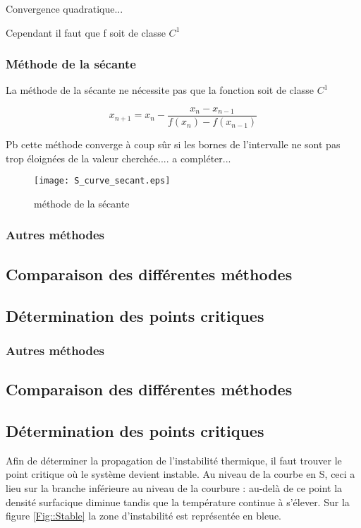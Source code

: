 Convergence quadratique...

Cependant il faut que f soit de classe $C^1$
\\
\subsubsection{Méthode de la sécante}

La méthode de la sécante ne nécessite pas que la fonction soit de classe $C^1$


\begin{equation}
x_{n+1} = x_n - \frac{x_n - x_{n-1}}{f(x_n) - f(x_{n-1})}
\end{equation}

Pb cette méthode converge à coup sûr si les bornes de l'intervalle ne sont pas trop éloignées de la valeur cherchée....
a compléter...

\begin{figure}[htb!]
	\centering
	\texttt{[image: S\_curve\_secant.eps]}
	\caption{méthode de la sécante}
	\label{Fig::bench}
\end{figure}


\subsubsection{Autres méthodes}

\subsection{Comparaison des différentes méthodes}

\subsection{Détermination des points critiques}
\subsubsection{Autres méthodes}

\subsection{Comparaison des différentes méthodes}

\subsection{Détermination des points critiques}
Afin de déterminer la propagation de l'instabilité thermique, il faut trouver le point critique où le système devient instable. Au niveau de la courbe en S, ceci a lieu sur la branche inférieure au niveau de la courbure : au-delà de ce point la densité surfacique diminue tandis que la température continue à s'élever. Sur la figure \ref{Fig::Stable} la zone d'instabilité est représentée en bleue.

